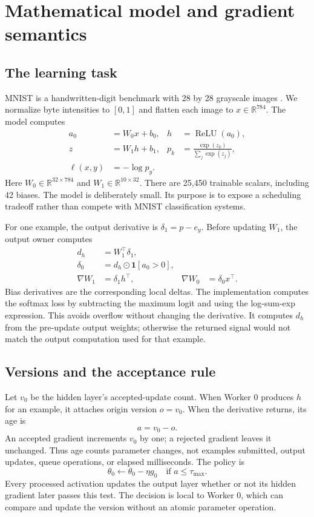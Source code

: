 \documentclass[conference]{IEEEtran}
\newcommand{\taumax}{\tau_{\max}}
\begin{document}
\section{Mathematical model and gradient semantics}
\subsection{The learning task}
MNIST is a handwritten-digit benchmark with 28 by 28 grayscale images \cite{mnist}. We normalize byte intensities to $[0,1]$ and flatten each image to $x\in\mathbb{R}^{784}$. The model computes
\begin{align}
 a_0 &= W_0x+b_0, & h&=\operatorname{ReLU}(a_0),\\
 z &= W_1h+b_1, & p_k&=\frac{\exp(z_k)}{\sum_j\exp(z_j)},\\
 \ell(x,y)&=-\log p_y.\label{eq:loss}
\end{align}
Here $W_0\in\mathbb{R}^{32\times784}$ and $W_1\in\mathbb{R}^{10\times32}$. There are 25,450 trainable scalars, including 42 biases. The model is deliberately small. Its purpose is to expose a scheduling tradeoff rather than compete with MNIST classification systems.

For one example, the output derivative is $\delta_1=p-e_y$. Before updating $W_1$, the output owner computes
\begin{align}
 d_h&=W_1^\top\delta_1,\\
 \delta_0&=d_h\odot\mathbf{1}[a_0>0],\\
 \nabla W_1&=\delta_1h^\top, & \nabla W_0&=\delta_0x^\top.
\end{align}
Bias derivatives are the corresponding local deltas. The implementation computes the softmax loss by subtracting the maximum logit and using the log-sum-exp expression. This avoids overflow without changing the derivative. It computes $d_h$ from the pre-update output weights; otherwise the returned signal would not match the output computation used for that example.

\subsection{Versions and the acceptance rule}
Let $v_0$ be the hidden layer's accepted-update count. When Worker 0 produces $h$ for an example, it attaches origin version $o=v_0$. When the derivative returns, its age is
\begin{equation}
 a=v_0-o.\label{eq:age}
\end{equation}
An accepted gradient increments $v_0$ by one; a rejected gradient leaves it unchanged. Thus age counts parameter changes, not examples submitted, output updates, queue operations, or elapsed milliseconds. The policy is
\begin{equation}
 \theta_0\leftarrow\theta_0-\eta g_0\quad\text{if }a\leq\taumax.\label{eq:gate}
\end{equation}
Every processed activation updates the output layer whether or not its hidden gradient later passes this test. The decision is local to Worker 0, which can compare and update the version without an atomic parameter operation.
\end{document}
